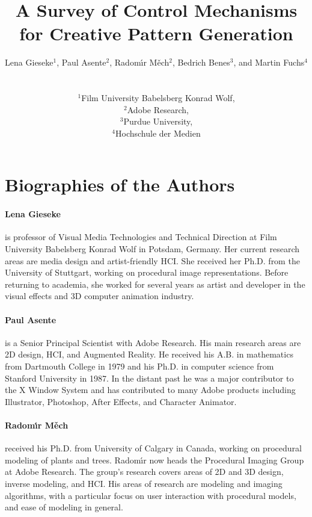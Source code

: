 \documentclass{egpubl}
\title[A Survey of Control Mechanisms for Creative Pattern Generation]%
      {A Survey of Control Mechanisms for Creative Pattern Generation}
\author[L. Gieseke, P. Asente, R. Mech, B. Benes, M. Fuchs]
{\parbox{\textwidth}{\centering Lena Gieseke$^{1}$, Paul Asente$^{2}$, Radom\'{\i}r M\v{e}ch$^{2}$, Bedrich Benes$^{3}$, and Martin Fuchs$^{4}$}
        \\
{\parbox{\textwidth}{\centering $^1$Film University Babelsberg Konrad Wolf,\\
         $^2$Adobe Research,\\
         $^3$Purdue University,\\
         $^4$Hochschule der Medien
       }
}
}
\begin{document}
\onecolumn

\maketitle


\section*{Biographies of the Authors}

\paragraph*{Lena Gieseke} is professor of Visual Media Technologies and Technical Direction at Film University Babelsberg Konrad Wolf in Potsdam, Germany. Her current research areas are media design and artist-friendly HCI. She received her Ph.D. from the University of Stuttgart, working on procedural image representations. Before returning to academia, she worked for several years as artist and developer in the visual effects and 3D computer animation industry.

\paragraph*{Paul Asente} is a Senior Principal Scientist with Adobe Research. His main research areas are 2D design, HCI, and Augmented Reality. He received his A.B. in mathematics from Dartmouth College in 1979 and his Ph.D. in computer science from Stanford University in 1987. In the distant past he was a major contributor to the X Window System and has contributed to many Adobe products including Illustrator, Photoshop, After Effects, and Character Animator.

\paragraph*{Radom\'{\i}r M\v{e}ch}  received his Ph.D. from University of Calgary in Canada, working on procedural modeling of plants and trees. {Radom\'{\i}r} now heads the Procedural Imaging Group at Adobe Research. The group's research covers areas of 2D and 3D design, inverse modeling, and HCI. His areas of research are modeling and imaging algorithms, with a particular focus on user interaction with procedural models, and ease of modeling in general.
\end{document}
